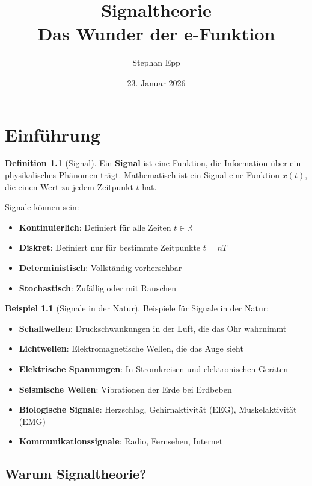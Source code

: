 ﻿\documentclass[a4paper,12pt]{report}
\title{\textbf{Signaltheorie} \\ {\Large Das Wunder der e-Funktion}}
\author{Stephan Epp}
\date{23. Januar 2026}
\theoremstyle{definition}
\newtheorem{definition}{Definition}
\newtheorem{beispiel}{Beispiel}
\begin{document}
	
	\maketitle
	\tableofcontents
	\newpage
	
	\chapter{Einführung}
	
	\begin{definition}[Signal]
		Ein \textbf{Signal} ist eine Funktion, die Information über ein physikalisches Phänomen trägt. Mathematisch ist ein Signal eine Funktion $x(t)$, die einen Wert zu jedem Zeitpunkt $t$ hat.
		
		Signale können sein:
		\begin{itemize}
			\item[-] \textbf{Kontinuierlich}: Definiert für alle Zeiten $t \in \mathbb{R}$
			\item[-] \textbf{Diskret}: Definiert nur für bestimmte Zeitpunkte $t = nT$
			\item[-] \textbf{Deterministisch}: Vollständig vorhersehbar
			\item[-] \textbf{Stochastisch}: Zufällig oder mit Rauschen
		\end{itemize}
	\end{definition}
	
	\begin{beispiel}[Signale in der Natur]
		Beispiele für Signale in der Natur:
		\begin{itemize}
			\item[-] \textbf{Schallwellen}: Druckschwankungen in der Luft, die das Ohr wahrnimmt
			\item[-] \textbf{Lichtwellen}: Elektromagnetische Wellen, die das Auge sieht
			\item[-] \textbf{Elektrische Spannungen}: In Stromkreisen und elektronischen Geräten
			\item[-] \textbf{Seismische Wellen}: Vibrationen der Erde bei Erdbeben
			\item[-] \textbf{Biologische Signale}: Herzschlag, Gehirnaktivität (EEG), Muskelaktivität (EMG)
			\item[-] \textbf{Kommunikationssignale}: Radio, Fernsehen, Internet
		\end{itemize}
	\end{beispiel}
	
	\section{Warum Signaltheorie?}
	
\end{document}
